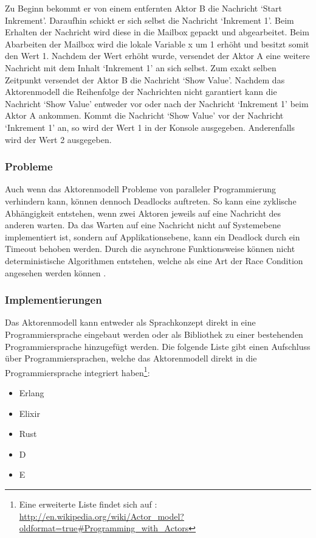 Zu Beginn bekommt er von einem entfernten Aktor B die Nachricht `Start Inkrement'. Daraufhin schickt er sich selbst die Nachricht `Inkrement 1'. Beim Erhalten der Nachricht wird diese in die Mailbox gepackt und abgearbeitet. Beim Abarbeiten der Mailbox wird die lokale Variable x um 1 erhöht und besitzt somit den Wert 1. Nachdem der Wert erhöht wurde, versendet der Aktor A eine weitere Nachricht mit dem Inhalt `Inkrement 1' an sich selbst. Zum exakt selben Zeitpunkt versendet der Aktor B die Nachricht `Show Value'. Nachdem das Aktorenmodell  die Reihenfolge der Nachrichten nicht garantiert kann die Nachricht `Show Value' entweder vor oder nach der Nachricht `Inkrement 1' beim Aktor A ankommen. Kommt die Nachricht `Show Value' vor der Nachricht `Inkrement 1' an, so wird der Wert 1 in der Konsole ausgegeben. Anderenfalls wird der Wert 2 ausgegeben.

\subsubsection{Probleme}
Auch wenn das Aktorenmodell Probleme von paralleler Programmierung verhindern kann, können dennoch Deadlocks auftreten. So kann eine zyklische Abhängigkeit entstehen, wenn zwei Aktoren jeweils auf eine Nachricht des anderen warten. Da das Warten auf eine Nachricht nicht auf Systemebene implementiert ist, sondern auf Applikationsebene, kann ein Deadlock durch ein Timeout behoben werden. Durch die asynchrone Funktionsweise können nicht deterministische Algorithmen entstehen, welche als eine Art der Race Condition angesehen werden können \cite[p. 86]{Erb2012}. 

\subsubsection{Implementierungen}
Das Aktorenmodell kann entweder als Sprachkonzept direkt in eine Programmiersprache eingebaut werden oder als Bibliothek zu einer bestehenden Programmiersprache hinzugefügt werden. Die folgende Liste gibt einen Aufschluss über Programmiersprachen, welche das Aktorenmodell direkt in die Programmiersprache integriert haben\footnote{Eine erweiterte Liste findet sich auf  \cite[p. 86]{Erb2012}: \url{http://en.wikipedia.org/wiki/Actor_model?oldformat=true#Programming_with_Actors}}:

\begin{itemize}
  \item Erlang
  \item Elixir
  \item Rust
  \item D
  \item E
\end{itemize}

